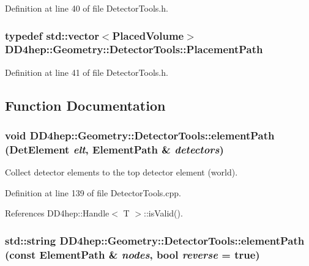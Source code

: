 Definition at line 40 of file DetectorTools.h.\hypertarget{namespace_d_d4hep_1_1_geometry_1_1_detector_tools_a6cc33285199e04dd336a33e6e62925e6}{
\subsubsection[{PlacementPath}]{\setlength{\rightskip}{0pt plus 5cm}typedef std::vector$<${\bf PlacedVolume}$>$ {\bf DD4hep::Geometry::DetectorTools::PlacementPath}}}
\label{namespace_d_d4hep_1_1_geometry_1_1_detector_tools_a6cc33285199e04dd336a33e6e62925e6}


Definition at line 41 of file DetectorTools.h.

\subsection{Function Documentation}
\hypertarget{namespace_d_d4hep_1_1_geometry_1_1_detector_tools_a10418f7d98665f48f0dcb14a02919fea}{
\subsubsection[{elementPath}]{\setlength{\rightskip}{0pt plus 5cm}void DD4hep::Geometry::DetectorTools::elementPath ({\bf DetElement} {\em elt}, \/  {\bf ElementPath} \& {\em detectors})}}
\label{namespace_d_d4hep_1_1_geometry_1_1_detector_tools_a10418f7d98665f48f0dcb14a02919fea}


Collect detector elements to the top detector element (world). 

Definition at line 139 of file DetectorTools.cpp.

References DD4hep::Handle$<$ T $>$::isValid().\hypertarget{namespace_d_d4hep_1_1_geometry_1_1_detector_tools_a67f5a1f1c0ed6ca5698a3323fc660379}{
\subsubsection[{elementPath}]{\setlength{\rightskip}{0pt plus 5cm}std::string DD4hep::Geometry::DetectorTools::elementPath (const {\bf ElementPath} \& {\em nodes}, \/  bool {\em reverse} = {\ttfamily true})}}
\label{namespace_d_d4hep_1_1_geometry_1_1_detector_tools_a67f5a1f1c0ed6ca5698a3323fc660379}


